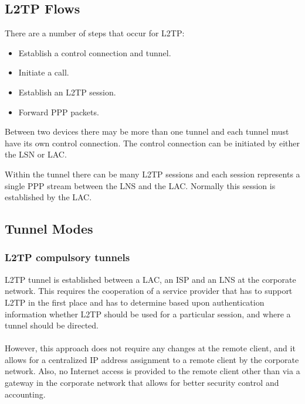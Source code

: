 \documentclass[10pt,a4paper]{article}
\begin{document}
\begin{itemize}
\begin{itemize}
\subsection{L2TP Flows}
There are a number of steps that occur for L2TP:

\begin{itemize}
\item Establish a control connection and tunnel.
\item Initiate a call.
\item Establish an L2TP session.
\item Forward PPP packets.
\end{itemize}

Between two devices there may be more than one tunnel and each tunnel must
have its own control connection. The control connection can be initiated by either
the LSN or LAC.

Within the tunnel there can be many L2TP sessions and each session represents
a single PPP stream between the LNS and the LAC. Normally this session is
established by the LAC.


\subsection{Tunnel Modes}
\subsubsection{L2TP compulsory tunnels}
L2TP tunnel is established between a LAC, an ISP and an
LNS at the corporate network. This requires the cooperation of a service provider
that has to support L2TP in the first place and has to determine based upon
authentication information whether L2TP should be used for a particular session,
and where a tunnel should be directed. 
\\
\\
However, this approach does not require
any changes at the remote client, and it allows for a centralized IP address assignment to a remote client by the corporate network. Also, no Internet access
is provided to the remote client other than via a gateway in the corporate network
that allows for better security control and accounting.



\end{itemize}
\end{itemize}
\end{document}
